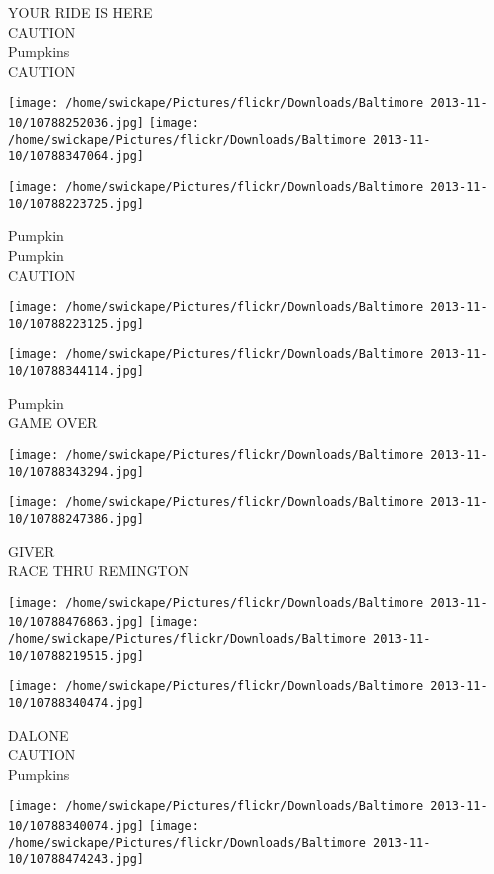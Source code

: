 \documentclass[10pt,letterpaper]{article}
\begin{document}
YOUR RIDE IS HERE\\
CAUTION\\
Pumpkins\\
CAUTION
\pagebreak

\texttt{[image: /home/swickape/Pictures/flickr/Downloads/Baltimore 2013-11-10/10788252036.jpg]}
\texttt{[image: /home/swickape/Pictures/flickr/Downloads/Baltimore 2013-11-10/10788347064.jpg]}

\vspace{0.25in}
\texttt{[image: /home/swickape/Pictures/flickr/Downloads/Baltimore 2013-11-10/10788223725.jpg]}

Pumpkin\\
Pumpkin\\
CAUTION
\pagebreak

\texttt{[image: /home/swickape/Pictures/flickr/Downloads/Baltimore 2013-11-10/10788223125.jpg]}

\vspace{0.25in}
\texttt{[image: /home/swickape/Pictures/flickr/Downloads/Baltimore 2013-11-10/10788344114.jpg]}

Pumpkin\\
GAME OVER
\pagebreak

\texttt{[image: /home/swickape/Pictures/flickr/Downloads/Baltimore 2013-11-10/10788343294.jpg]}

\vspace{0.25in}
\texttt{[image: /home/swickape/Pictures/flickr/Downloads/Baltimore 2013-11-10/10788247386.jpg]}

GIVER\\
RACE THRU REMINGTON
\pagebreak

\texttt{[image: /home/swickape/Pictures/flickr/Downloads/Baltimore 2013-11-10/10788476863.jpg]}
\texttt{[image: /home/swickape/Pictures/flickr/Downloads/Baltimore 2013-11-10/10788219515.jpg]}

\vspace{0.25in}
\texttt{[image: /home/swickape/Pictures/flickr/Downloads/Baltimore 2013-11-10/10788340474.jpg]}

DALONE\\
CAUTION\\
Pumpkins
\pagebreak

\texttt{[image: /home/swickape/Pictures/flickr/Downloads/Baltimore 2013-11-10/10788340074.jpg]}
\texttt{[image: /home/swickape/Pictures/flickr/Downloads/Baltimore 2013-11-10/10788474243.jpg]}
\end{document}
